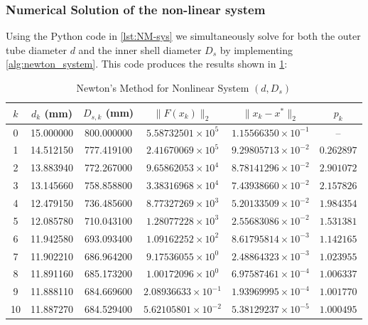 \documentclass[11pt, a4paper]{article}
\theoremstyle{definition}
\begin{document}
\subsubsection{Numerical Solution of the non-linear system}
Using the Python code in \cref{lst:NM-sys} we simultaneously solve for both the outer tube diameter $d$ and the inner shell diameter $D_s$ by implementing \cref{alg:newton_system}.
This code produces the results shown in \cref{tab:newton_sys:results}:

\begin{table}[h!]

\centering
\caption{Newton's Method for Nonlinear System $(d, D_s)$}
\label{tab:newton_sys:results}
\begin{tabular}{cccccc}
\hline
\textbf{$k$} & \textbf{$d_k$ (mm)} & \textbf{$D_{s,k}$ (mm)} & \textbf{$\lVert F(x_k)\rVert_2$} & \textbf{$\lVert x_k - x^*\rVert_2$} & \textbf{$p_k$} \\
\hline
 0  &  15.000000  & 800.000000  & $5.58732501\times 10^{5}$ & $1.15566350\times 10^{-1}$ & -- \\
 1  &  14.512150  & 777.419100  & $2.41670069\times 10^{5}$ & $9.29805713\times 10^{-2}$ & $0.262897$ \\
 2  &  13.883940  & 772.267000  & $9.65862053\times 10^{4}$ & $8.78141296\times 10^{-2}$ & $2.901072$ \\
 3  &  13.145660  & 758.858800  & $3.38316968\times 10^{4}$ & $7.43938660\times 10^{-2}$ & $2.157826$ \\
 4  &  12.479150  & 736.485600  & $8.77327269\times 10^{3}$ & $5.20133509\times 10^{-2}$ & $1.984354$ \\
 5  &  12.085780  & 710.043100  & $1.28077228\times 10^{3}$ & $2.55683086\times 10^{-2}$ & $1.531381$ \\
 6  &  11.942580  & 693.093400  & $1.09162252\times 10^{2}$ & $8.61795814\times 10^{-3}$ & $1.142165$ \\
 7  &  11.902210  & 686.964200  & $9.17536055\times 10^{0}$ & $2.48864323\times 10^{-3}$ & $1.023955$ \\
 8  &  11.891160  & 685.173200  & $1.00172096\times 10^{0}$ & $6.97587461\times 10^{-4}$ & $1.006337$ \\
 9  &  11.888110  & 684.669600  & $2.08936633\times 10^{-1}$ & $1.93969995\times 10^{-4}$ & $1.001770$ \\
10  &  11.887270  & 684.529400  & $5.62105801\times 10^{-2}$ & $5.38129237\times 10^{-5}$ & $1.000495$ \\

\end{tabular}
\end{table}
\end{document}
